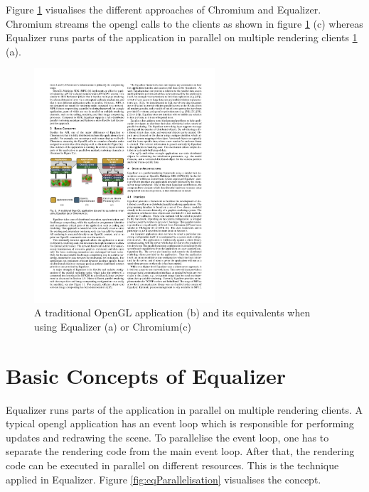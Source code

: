 Figure \ref{fig:eqVsChromium} visualises the different approaches of Chromium and Equalizer. Chromium streams the \gls{opengl} calls to the clients as shown in figure \ref{fig:eqVsChromium} (c) whereas Equalizer runs parts of the application in parallel on multiple rendering clients \ref{fig:eqVsChromium} (a).

\begin{figure}[H]
	\centering
	\includegraphics[width=0.6\textwidth]{../figures/eqVsChromium}
	\caption{A traditional OpenGL application (b) and its equivalents when using Equalizer (a) or Chromium(c)\cite{eqParallel}}
	\label{fig:eqVsChromium}
\end{figure}

\section{Basic Concepts of Equalizer}
Equalizer runs parts of the application in parallel on multiple rendering clients. A typical \gls{opengl} application has an event loop which is responsible for performing updates and redrawing the scene. To parallelise the event loop, one has to separate the rendering code from the main event loop. After that, the rendering code can be executed in parallel on different resources. This is the technique applied in Equalizer. Figure \ref{fig:eqParallelisation} visualises the concept.

